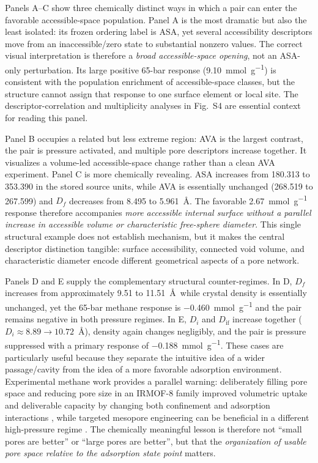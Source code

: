 \documentclass[11pt,a4paper]{article}
\newcommand{\SIfig}[1]{Fig.~S#1}
\begin{document}
Panels A--C show three chemically distinct ways in which a pair can enter the
favorable accessible-space population. Panel A is the most dramatic but also the
least isolated: its frozen ordering label is ASA, yet several accessibility
descriptors move from an inaccessible/zero state to substantial nonzero values.
The correct visual interpretation is therefore a \emph{broad accessible-space
opening}, not an ASA-only perturbation. Its large positive
65-bar response (\SI{9.10}{\milli\mole\per\gram}) is consistent with the
population enrichment of accessible-space classes, but the structure cannot assign
that response to one surface element or local site. The descriptor-correlation and
multiplicity analyses in \SIfig{4} are essential context for reading this panel.

Panel B occupies a related but less extreme region: AVA is the largest contrast,
the pair is pressure activated, and multiple pore descriptors increase together.
It visualizes a volume-led accessible-space change rather than a clean AVA
experiment. Panel C is more chemically revealing. ASA increases from 180.313 to
353.390 in the stored source units, while AVA is essentially unchanged
(268.519 to 267.599) and $D_f$ decreases from 8.495 to 5.961~\AA. The favorable
\SI{2.67}{\milli\mole\per\gram} response therefore accompanies \emph{more
accessible internal surface without a parallel increase in accessible volume or
characteristic free-sphere diameter}. This single structural example does not
establish mechanism, but it makes the central descriptor distinction tangible:
surface accessibility, connected void volume, and characteristic diameter encode
different geometrical aspects of a pore network.

Panels D and E supply the complementary structural counter-regimes. In D, $D_f$
increases from approximately 9.51 to 11.51~\AA\ while crystal density is essentially
unchanged, yet the 65-bar methane response is
\SI{-0.460}{\milli\mole\per\gram} and the pair remains negative in both pressure
regimes. In E, $D_i$ and $D_{\mathrm{if}}$ increase together
($D_i\approx8.89\rightarrow10.72$~\AA), density again changes negligibly, and the
pair is pressure suppressed with a primary response of
\SI{-0.188}{\milli\mole\per\gram}. These cases are particularly useful because
they separate the intuitive idea of a wider passage/cavity from the idea of a more
favorable adsorption environment. Experimental methane work provides a parallel
warning: deliberately filling pore space and reducing pore size in an IRMOF-8
family improved volumetric uptake and deliverable capacity by changing both
confinement and adsorption interactions \cite{tran2015porefilling}, while targeted
mesopore engineering can be beneficial in a different high-pressure regime
\cite{liang2017poregeometry}. The chemically meaningful lesson is therefore not
``small pores are better'' or ``large pores are better'', but that the
\emph{organization of usable pore space relative to the adsorption state point}
matters.
\end{document}
